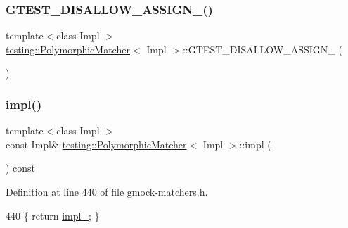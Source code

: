 \subsubsection{\texorpdfstring{G\+T\+E\+S\+T\+\_\+\+D\+I\+S\+A\+L\+L\+O\+W\+\_\+\+A\+S\+S\+I\+G\+N\+\_\+()}{GTEST\_DISALLOW\_ASSIGN\_()}}
{\footnotesize\ttfamily template$<$class Impl $>$ \\
\hyperlink{classtesting_1_1PolymorphicMatcher}{testing\+::\+Polymorphic\+Matcher}$<$ Impl $>$\+::G\+T\+E\+S\+T\+\_\+\+D\+I\+S\+A\+L\+L\+O\+W\+\_\+\+A\+S\+S\+I\+G\+N\+\_\+ (\begin{DoxyParamCaption}\item[{\hyperlink{classtesting_1_1PolymorphicMatcher}{Polymorphic\+Matcher}$<$ Impl $>$}]{ }\end{DoxyParamCaption})\hspace{0.3cm}{\ttfamily [private]}}

\mbox{\label{classtesting_1_1PolymorphicMatcher_ab10e4858d8dc903d3e1e378d53d25882}} 
\subsubsection{\texorpdfstring{impl()}{impl()}}
{\footnotesize\ttfamily template$<$class Impl $>$ \\
const Impl\& \hyperlink{classtesting_1_1PolymorphicMatcher}{testing\+::\+Polymorphic\+Matcher}$<$ Impl $>$\+::impl (\begin{DoxyParamCaption}{ }\end{DoxyParamCaption}) const\hspace{0.3cm}{\ttfamily [inline]}}



Definition at line 440 of file gmock-\/matchers.\+h.


\begin{DoxyCode}
440 \{ \textcolor{keywordflow}{return} \hyperlink{classtesting_1_1PolymorphicMatcher_adadea4f2c7b639586ed2f21b27303382}{impl\_}; \}
\end{DoxyCode}
\mbox{\label{classtesting_1_1PolymorphicMatcher_a3b7227b1f5c203efd47d393b781b317c}} 
